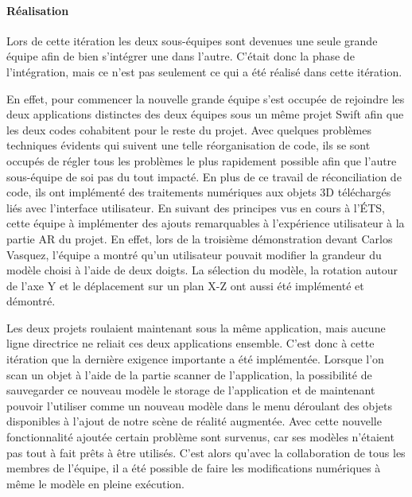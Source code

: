 \documentclass[rapport.tex]{subfiles}
\begin{document}
\paragraph*{Réalisation}
Lors de cette itération les deux sous-équipes sont devenues une seule grande équipe afin de bien s’intégrer une dans l’autre. C’était donc la phase de l'intégration, mais ce n’est pas seulement ce qui a été réalisé dans cette itération.
\par
En effet, pour commencer la nouvelle grande équipe s’est occupée de rejoindre les deux applications distinctes des deux équipes sous un même projet Swift afin que les deux codes cohabitent pour le reste du projet. Avec quelques problèmes techniques évidents qui suivent une telle réorganisation de code, ils se sont occupés de régler tous les problèmes le plus rapidement possible afin que l’autre sous-équipe de soi pas du tout impacté. En plus de ce travail de réconciliation de code, ils ont implémenté des traitements numériques aux objets 3D téléchargés liés avec l’interface utilisateur. En suivant des principes vus en cours à l’ÉTS, cette équipe à implémenter des ajouts remarquables à l’expérience utilisateur à la partie AR du projet. En effet, lors de la troisième démonstration devant Carlos Vasquez, l’équipe a montré qu’un utilisateur pouvait modifier la grandeur du modèle choisi à l’aide de deux doigts. La sélection du modèle, la rotation autour de l’axe Y et le déplacement sur un plan X-Z ont aussi été implémenté et démontré.
\par
Les deux projets roulaient maintenant sous la même application, mais aucune ligne directrice ne reliait ces deux applications ensemble. C’est donc à cette itération que la dernière exigence importante a été implémentée. Lorsque l’on scan un objet à l’aide de la partie scanner de l’application, la possibilité de sauvegarder ce nouveau modèle le storage de l’application et de maintenant pouvoir l’utiliser comme un nouveau modèle dans le menu déroulant des objets disponibles à l’ajout de notre scène de réalité augmentée. Avec cette nouvelle fonctionnalité ajoutée certain problème sont survenus, car ses modèles n’étaient pas tout à fait prêts à être utilisés. C’est alors qu’avec la collaboration de tous les membres de l’équipe, il a été possible de faire les modifications numériques à même le modèle en pleine exécution.
\end{document}
